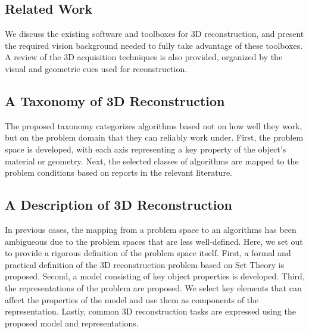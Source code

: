 \subsection{Related Work}
We discuss the existing software and toolboxes for 3D reconstruction, and present the required vision background needed to fully take advantage of these toolboxes. A review of the 3D acquisition techniques is also provided, organized by the visual and geometric cues used for reconstruction.

\subsection{A Taxonomy of 3D Reconstruction}
The proposed taxonomy categorizes algorithms based not on how well they work, but on the problem domain that they can reliably work under. First, the problem space is developed, with each axis representing a key property of the object's material or geometry. Next, the selected classes of algorithms are mapped to the problem conditions based on reports in the relevant literature.

\subsection{A Description of 3D Reconstruction}
In previous cases, the mapping from a problem space to an algorithms has been ambigueous due to the problem spaces that are less well-defined. Here, we set out to provide a rigorous definition of the problem space itself. First, a formal and practical definition of the 3D reconstruction problem based on Set Theory is proposed. Second, a model consisting of key object properties is developed. Third, the representations of the problem are proposed. We select key elements that can affect the properties of the model and use them as components of the representation. Lastly, common 3D reconstruction tasks are expressed using the proposed model and representations.



